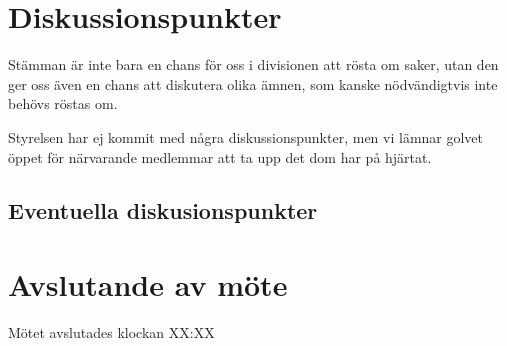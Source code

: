 \documentclass[protokoll]{dvd}
\begin{document}
\newpage
\section{Diskussionspunkter}
Stämman är inte bara en chans för oss i divisionen att rösta om saker, utan den ger oss även en chans att diskutera olika ämnen, som kanske nödvändigtvis inte behövs röstas om.

Styrelsen har ej kommit med några diskussionspunkter, men vi lämnar golvet
öppet för närvarande medlemmar att ta upp det dom har på hjärtat.

\subsection*{Eventuella diskusionspunkter}

\section{Avslutande av möte}

Mötet avslutades klockan XX:XX

\end{document}
